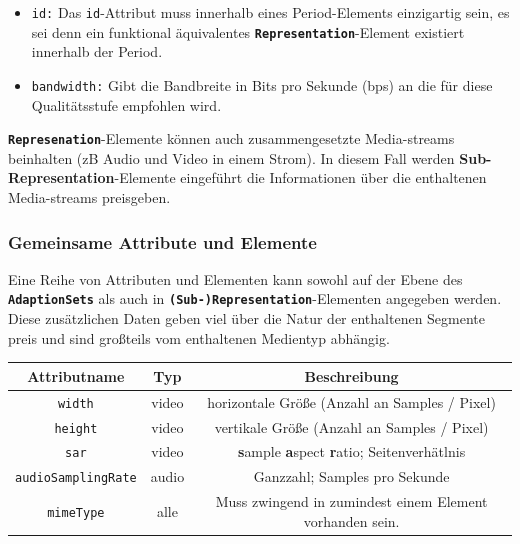 \documentclass[paper = a4, fontsize = 12pt, parskip = half]{scrartcl} %
\def\attr#1{\texttt{#1}}
\def\elem#1{\texttt{\textbf{#1}}}
\begin{document}
\begin{itemize}
	\item \attr{id:} Das \attr{id}-Attribut muss innerhalb eines Period-Elements einzigartig sein, es sei denn ein funktional äquivalentes \elem{Representation}-Element existiert innerhalb der Period.
	\item \attr{bandwidth:} Gibt die Bandbreite in Bits pro Sekunde (bps) an die für diese Qualitätsstufe empfohlen wird.
\end{itemize}

\elem{Represenation}-Elemente können auch zusammengesetzte Media-streams beinhalten (zB Audio und Video in einem Strom). In diesem Fall werden \textbf{Sub-Representation}-Elemente eingeführt die Informationen über die enthaltenen Media-streams preisgeben.

\subsubsection{Gemeinsame Attribute und Elemente}
Eine Reihe von Attributen und Elementen kann sowohl auf der Ebene des \elem{AdaptionSets} als auch in \elem{(Sub-)Representation}-Elementen angegeben werden. Diese zusätzlichen Daten geben viel über die Natur der enthaltenen Segmente preis und sind großteils vom enthaltenen Medientyp abhängig.

\begin{center}
	\begin{tabular}{| c | c | c |}
		\hline
		\textbf{Attributname} & \textbf{Typ} & \textbf{Beschreibung}                                            \\
		\hline
		\hline
		\attr{width}                 & video        & horizontale Größe (Anzahl an Samples / Pixel)                    \\
		\hline
		\attr{height}                & video        & vertikale Größe (Anzahl an Samples / Pixel)                      \\
		\hline
		\attr{sar}                   & video        & \textbf{s}ample \textbf{a}spect \textbf{r}atio; Seitenverhätlnis \\
		\hline
		\attr{audioSamplingRate}     & audio        & Ganzzahl; Samples pro Sekunde                                    \\
		\hline
		\attr{mimeType}              & alle         & Muss zwingend in zumindest einem Element vorhanden sein.         \\
		\hline
	\end{tabular}
\end{center}
\end{document}
